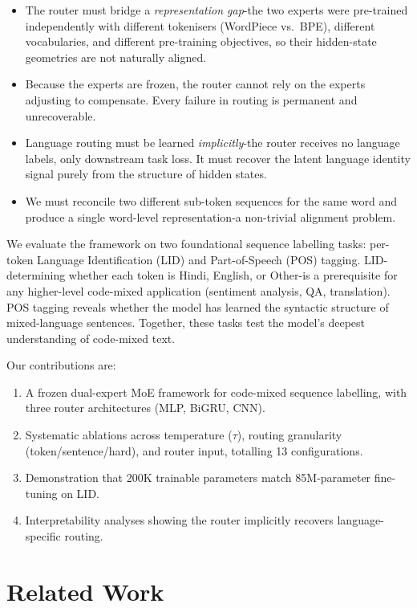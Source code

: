 \documentclass[conference]{IEEEtran}
\begin{document}
\begin{itemize}
  \item The router must bridge a \textit{representation gap}-the two experts were pre-trained independently with different tokenisers (WordPiece vs.\ BPE), different vocabularies, and different pre-training objectives, so their hidden-state geometries are not naturally aligned.
  \item Because the experts are frozen, the router cannot rely on the experts adjusting to compensate. Every failure in routing is permanent and unrecoverable.
  \item Language routing must be learned \textit{implicitly}-the router receives no language labels, only downstream task loss. It must recover the latent language identity signal purely from the structure of hidden states.
  \item We must reconcile two different sub-token sequences for the same word and produce a single word-level representation-a non-trivial alignment problem.
\end{itemize}

We evaluate the framework on two foundational sequence labelling tasks: per-token Language Identification (LID) and Part-of-Speech (POS) tagging. LID-determining whether each token is Hindi, English, or Other-is a prerequisite for any higher-level code-mixed application (sentiment analysis, QA, translation). POS tagging reveals whether the model has learned the syntactic structure of mixed-language sentences. Together, these tasks test the model's deepest understanding of code-mixed text.

Our contributions are:
\begin{enumerate}
  \item A frozen dual-expert MoE framework for code-mixed sequence labelling, with three router architectures (MLP, BiGRU, CNN).
  \item Systematic ablations across temperature ($\tau$), routing granularity (token/sentence/hard), and router input, totalling 13 configurations.
  \item Demonstration that 200K trainable parameters match 85M-parameter fine-tuning on LID.
  \item Interpretability analyses showing the router implicitly recovers language-specific routing.
\end{enumerate}

\section{Related Work}
\end{document}
